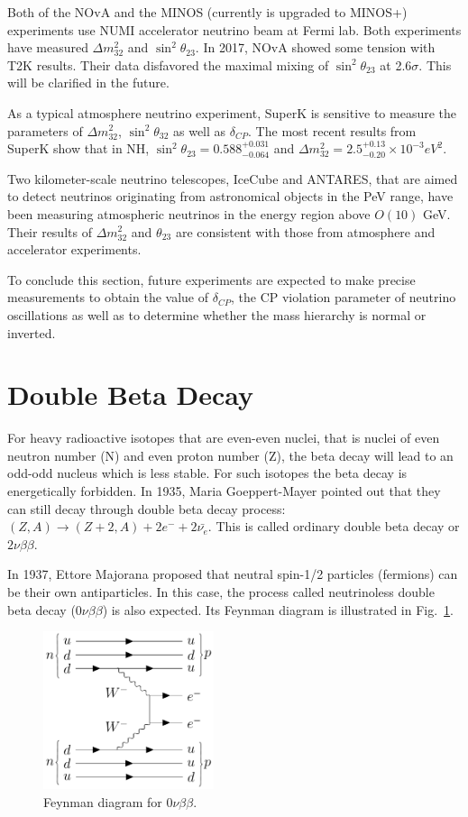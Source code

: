 \documentclass[preprint,12pt]{elsarticle}
\numberwithin{equation}{section}
\begin{document}
Both of the NOvA and the MINOS (currently is upgraded to MINOS+) experiments use NUMI accelerator neutrino beam at Fermi lab. Both experiments have measured $\Delta m^2_{32}$ and $\sin^2\theta_{23}$. In 2017, NOvA showed some tension with T2K results. Their data disfavored the maximal mixing of $\sin^2\theta_{23}$ at 2.6$\sigma$. This will be clarified in the future\cite{nova}.

As a typical atmosphere neutrino experiment, SuperK is sensitive to measure the parameters of $\Delta m^2_{32}$, $\sin^2\theta_{32}$ as well as $\delta_{CP}$. The most recent results from SuperK show that in NH, $\sin^2\theta_{23}=0.588^{+0.031}_{-0.064}$ and $\Delta m^2_{32} = 2.5^{+0.13}_{-0.20}\times 10^{-3} eV^2$\cite{superk_new}.

Two kilometer-scale neutrino telescopes, IceCube and ANTARES, that are aimed to detect neutrinos originating from astronomical objects in the PeV range, have been measuring atmospheric neutrinos in the energy region above $O(10)$ GeV. Their results of $\Delta m^2_{32}$ and $\theta_{23}$ are consistent with those from atmosphere and accelerator experiments\cite{stateofart}.  

To conclude this section, future experiments are expected to make precise measurements to obtain the value of $\delta_{CP}$, the CP violation parameter of neutrino oscillations as well as to determine whether the mass hierarchy is normal or inverted.

\section{Double Beta Decay}

For heavy radioactive isotopes that are even-even nuclei, that is nuclei of even neutron number (N) and even proton number (Z), the beta decay will lead to an odd-odd nucleus which is less stable. For such isotopes the beta decay is energetically forbidden. In 1935, Maria Goeppert-Mayer pointed out that they can still decay through double beta decay process: $(Z,A) \to (Z+2,A)+2e^{-}+2\bar{\nu_e}$. This is called ordinary double beta decay or $2\nu\beta\beta$\cite{martin}.

In 1937, Ettore Majorana proposed that neutral spin-1/2 particles (fermions) can be their own antiparticles\cite{majorana}. In this case, the process called neutrinoless double beta decay ($0\nu\beta\beta$) is also expected. Its Feynman diagram is illustrated in Fig.~\ref{feynman}.
\begin{figure}[htbp]
	\centering	
	\includegraphics[width=5cm]{doubleBeta_feynman.png}
	\caption{ Feynman diagram for $0\nu\beta\beta$.}
	\label{feynman}
\end{figure}
\end{document}
